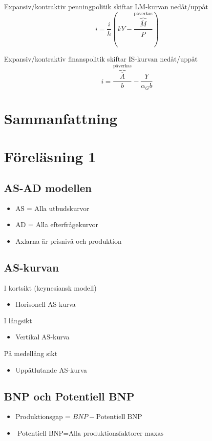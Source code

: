 \documentclass[12pt,a4paper]{article}
\begin{document}
\noindent Expansiv/kontraktiv penningpolitik skiftar LM-kurvan nedåt/uppåt
$$i = \frac{i}{h}(kY - \frac{\overbrace{\overline{M}}^{\text{påverkas}}}{\overline{P}})$$

\noindent Expansiv/kontraktiv finanspolitik skiftar IS-kurvan nedåt/uppåt
$$i = \frac{\overbrace{\overline{A}}^{\text{påverkas}}}{b} - \frac{Y}{\alpha_G b}$$

\newpage
\section{Sammanfattning}
\section*{Föreläsning 1}
\subsection*{AS-AD modellen}
\begin{itemize}
    \item AS = Alla utbudskurvor
    \item AD = Alla efterfrågekurvor
    \item Axlarna är prisnivå och produktion
\end{itemize}

\subsection*{AS-kurvan}
I kortsikt (keynesiansk modell)
\begin{itemize}
    \item Horisonell AS-kurva
\end{itemize}

I långsikt
\begin{itemize}
    \item Vertikal AS-kurva
\end{itemize}

På medellång sikt
\begin{itemize}
    \item Uppåtlutande AS-kurva
\end{itemize}

\subsection*{BNP och Potentiell BNP}
\begin{itemize}
    \item Produktionsgap = $BNP - \text{Potentiell BNP}$
    \item $\text{Potentiell BNP} = \text{Alla produktionsfaktorer maxas}$
\end{itemize}
\end{document}
